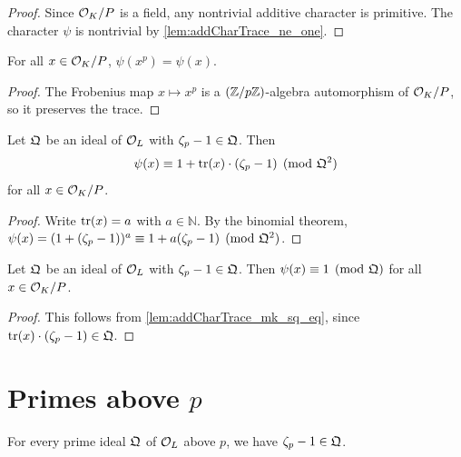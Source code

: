 \begin{proof}
  \leanok
  Since $\mathcal{O}_K/P$ is a field, any nontrivial additive character is primitive.
  The character $\psi$ is nontrivial by \ref{lem:addCharTrace_ne_one}.
\end{proof}

\begin{lemma}
  \label{lem:addCharTrace_frob_apply}
  \leanok
  For all $x \in \mathcal{O}_K/P$, $\psi(x^p) = \psi(x)$.
\end{lemma}

\begin{proof}
  \leanok
  The Frobenius map $x \mapsto x^p$ is a $(\mathbb{Z}/p\mathbb{Z})$-algebra automorphism of $\mathcal{O}_K/P$, so
  it preserves the trace.
\end{proof}

\begin{lemma}
  \label{lem:addCharTrace_mk_sq_eq}
  \leanok
  Let $\mathfrak{Q}$ be an ideal of $\mathcal{O}_L$ with $\zeta_p - 1 \in \mathfrak{Q}$. Then
  \[
    \psi(x) \equiv 1 + \mathrm{tr}(x) \cdot (\zeta_p - 1) \pmod{\mathfrak{Q}^2}
  \]
  for all $x \in \mathcal{O}_K/P$.
\end{lemma}

\begin{proof}
  \leanok
  Write $\mathrm{tr}(x) = a$ with $a \in \mathbb{N}$. By the binomial theorem,
  $\psi(x) = (1 + (\zeta_p - 1))^a \equiv 1 + a(\zeta_p - 1) \pmod{\mathfrak{Q}^2}$.
\end{proof}

\begin{lemma}
  \label{lem:addCharTrace_mk_eq_one}
  \leanok
  Let $\mathfrak{Q}$ be an ideal of $\mathcal{O}_L$ with $\zeta_p - 1 \in \mathfrak{Q}$.
  Then $\psi(x) \equiv 1 \pmod{\mathfrak{Q}}$ for all $x \in \mathcal{O}_K/P$.
\end{lemma}

\begin{proof}
  \leanok
  This follows from \ref{lem:addCharTrace_mk_sq_eq}, since $\mathrm{tr}(x) \cdot (\zeta_p - 1) \in \mathfrak{Q}$.
\end{proof}

\section{Primes above $p$}

\begin{lemma}
  \label{lem:zeta_sub_one_mem}
  \leanok
  For every prime ideal $\mathfrak{Q}$ of $\mathcal{O}_L$ above $p$, we have $\zeta_p - 1 \in \mathfrak{Q}$.
\end{lemma}

